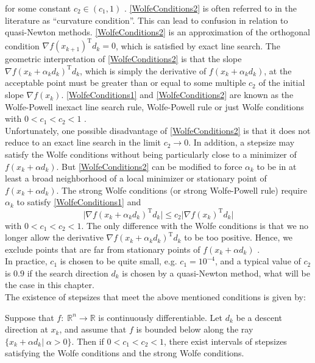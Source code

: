 for some constant $c_2 \in (c_1, 1)$ \cite[p.~33]{NocedalWright:2006}. \cref{WolfeConditions2} is often referred to in the literature as “curvature condition”. This can lead to confusion in relation to quasi-Newton methods. \cref{WolfeConditions2} is an approximation of the orthogonal condition $\nabla f(x_{k+1})^{\mathrm{T}} d_k = 0$, which is satisfied by exact line search. The geometric interpretation of \cref{WolfeConditions2} is that the slope $\nabla f(x_k + \alpha_k d_k)^{\mathrm{T}} d_k$, which is simply the derivative of $f(x_k + \alpha_k d_k)$, at the acceptable point must be greater than or equal to some multiple $c_2$ of the initial slope $\nabla f(x_k)$. \cref{WolfeConditions1} and \cref{WolfeConditions2} are known as the Wolfe-Powell inexact line search rule, Wolfe-Powell rule or just Wolfe conditions with $0 < c_1 < c_2 < 1$ \cite[p.~104]{SunYuan:2006}. \\
Unfortunately, one possible disadvantage of \cref{WolfeConditions2} is that it does not reduce to an exact line search in the limit $c_2 \rightarrow 0$. In addition, a stepsize may satisfy the Wolfe conditions without being particularly close to a minimizer of $f(x_k + \alpha d_k)$. But \cref{WolfeConditions2} can be modified to force $\alpha_k$ to be in at least a broad neighborhood of a local minimizer or stationary point of $f(x_k + \alpha d_k)$. The strong Wolfe conditions (or strong Wolfe-Powell rule) require $\alpha_k$ to satisfy \cref{WolfeConditions1} and 
\begin{equation}\label{StrongWolfeCondition}
    \lvert \nabla f(x_k + \alpha_k d_k)^{\mathrm{T}} d_k \rvert \leq c_2 \lvert \nabla f(x_k)^{\mathrm{T}} d_k \rvert
\end{equation}
with $0 < c_1 < c_2 < 1$. The only difference with the Wolfe conditions is that we no longer allow the derivative $\nabla f(x_k + \alpha_k d_k)^{\mathrm{T}} d_k$ to be too positive. Hence, we exclude points that are far from stationary points of $f(x_k + \alpha d_k)$ \cite[p.~34]{NocedalWright:2006}. \\
In practice, $c_1$ is chosen to be quite small, e.g. $c_1 = 10^{-4}$, and a typical value of $c_2$ is $0.9$ if the search direction $d_k$ is chosen by a quasi-Newton method, what will be the case in this chapter. \\
The existence of stepsizes that meet the above mentioned conditions is given by:

\begin{lemma} \label{WolfeConditionsLemma}
    Suppose that $f \colon \; \mathbb{R}^n \to \mathbb{R}$ is continuously differentiable. Let $d_k$ be a descent direction at $x_k$, and assume that $f$ is bounded below along the ray $\{x_k + \alpha d_k \vert \; \alpha >0 \}$. Then if $0 < c_1 < c_2 < 1$, there exist intervals of stepsizes satisfying the Wolfe conditions and the strong Wolfe conditions.
\end{lemma}

